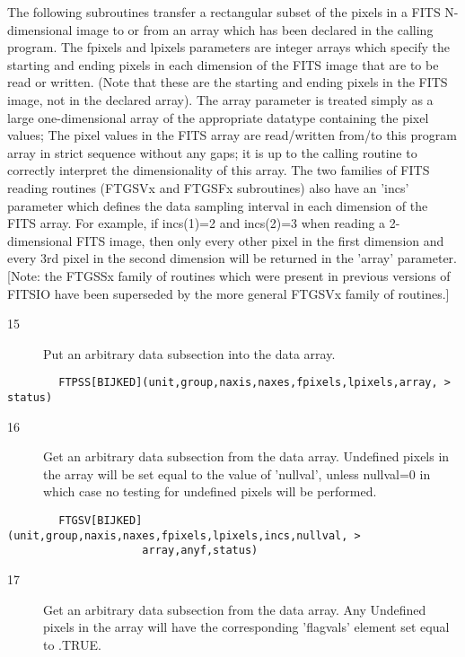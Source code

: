 \documentclass[11pt]{book}
\begin{document}
The following subroutines transfer a rectangular subset of the pixels
in a FITS N-dimensional image to or from an array which has been
declared in the calling program.  The fpixels and lpixels parameters
are integer arrays which specify the starting and ending pixels in each
dimension of the FITS image that are to be read or written.  (Note that
these are the starting and ending pixels in the FITS image, not in the
declared array). The array parameter is treated simply as a large
one-dimensional array of the appropriate datatype containing the pixel
values; The pixel values in the FITS array are read/written  from/to
this program array in strict sequence without any gaps;  it is up to
the calling routine to correctly interpret the dimensionality of this
array.  The two families of FITS reading routines (FTGSVx and FTGSFx
subroutines) also have an 'incs' parameter which defines the
data sampling interval in each dimension of the FITS array.  For
example, if incs(1)=2 and incs(2)=3 when reading a 2-dimensional
FITS image, then only every other pixel in the first dimension
and every 3rd pixel in the second dimension will be returned in
the 'array' parameter. [Note: the FTGSSx family of routines which
were present in previous versions of FITSIO have been superseded
by the more general FTGSVx family of routines.]


\begin{description}
\item[15]   Put an arbitrary data subsection into the data array.
\end{description}

\begin{verbatim}
        FTPSS[BIJKED](unit,group,naxis,naxes,fpixels,lpixels,array, > status)
\end{verbatim}

\begin{description}
\item[16]    Get an arbitrary data subsection from the data array.  Undefined
       pixels in the array will be set equal to the value of 'nullval',
       unless nullval=0 in which case no testing for undefined pixels will
      be performed.
\end{description}

\begin{verbatim}
        FTGSV[BIJKED](unit,group,naxis,naxes,fpixels,lpixels,incs,nullval, >
                     array,anyf,status)
\end{verbatim}

\begin{description}
\item[17]    Get an arbitrary data subsection from the data array.  Any Undefined
       pixels in the array will have the corresponding 'flagvals'
      element set equal to .TRUE.
\end{description}
\end{document}
